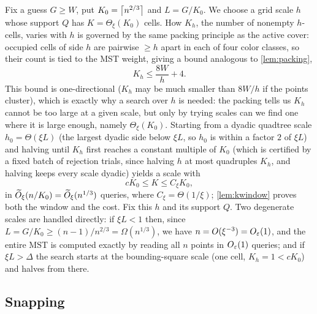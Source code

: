 Fix a guess $G\ge W$, put $K_0=\left\lceil n^{2/3} \right\rceil$ and $L=G/K_0$. We choose a grid scale $h$ whose support
$Q$ has $K=\Theta_\xi(K_0)$ cells. How $K_h$, the number of nonempty $h$-cells, varies with $h$ is governed by
the same packing principle as the active cover: occupied cells of side $h$ are pairwise $\ge h$ apart in
each of four color classes, so their count is tied to the MST weight, giving a bound analogous to
\cref{lem:packing},
\begin{equation}\label{eq:Kh-packing}
  K_h\le\frac{8W}{h}+4 .
\end{equation}
This bound is one-directional ($K_h$ may be much smaller than $8W/h$ if the points cluster), which is
exactly why a search over $h$ is needed: the packing tells us $K_h$ cannot be too large at a given scale,
but only by trying scales can we find one where it is large enough, namely $\Theta_\xi(K_0)$.
Starting from a dyadic quadtree scale $h_0=\Theta(\xi L)$ (the largest dyadic side below $\xi L$, so $h_0$
is within a factor $2$ of $\xi L$) and halving until $K_h$ first reaches a constant multiple of $K_0$
(which is certified by a fixed batch of rejection trials, since halving $h$ at most quadruples $K_h$, and
halving keeps every scale dyadic) yields a scale with
\begin{equation}\label{eq:K-window}
  cK_0\le K\le C_\xi K_0 ,
\end{equation}
in $\widetilde{O}_\xi(n/K_0)=\widetilde{O}_\xi(n^{1/3})$ queries, where $C_\xi=\Theta(1/\xi)$; \cref{lem:kwindow} proves
both the window and the cost.
Fix this $h$ and its support $Q$. Two degenerate scales are handled directly: if $\xi L<1$ then, since
$L=G/K_0\ge(n-1)/n^{2/3}=\Omega(n^{1/3})$, we have $n=O(\xi^{-3})=O_\varepsilon(1)$, and the entire MST is computed
exactly by reading all $n$ points in $O_\varepsilon(1)$ queries; and if $\xi L>\Delta$ the search starts at the
bounding-square scale (one cell, $K_h=1<cK_0$) and halves from there.

\subsection{Snapping}\label{sec:dt-snap}


